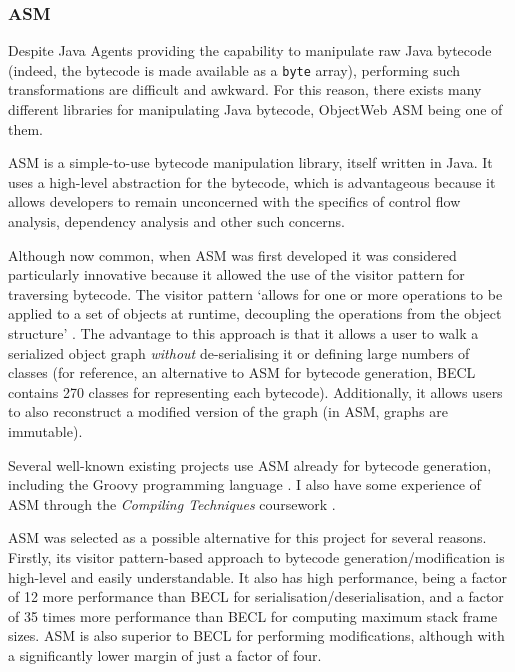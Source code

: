		\subsubsection{ASM} \label{sec:instrumentation/bytecode-instr/asm}
		Despite Java Agents providing the capability to manipulate raw Java bytecode (indeed, the bytecode is made available as a \texttt{byte} array), performing such transformations are difficult and awkward. For this reason, there exists many different libraries for manipulating Java bytecode, ObjectWeb ASM being one of them.
		
		ASM \citep{Bruneton2002} is a simple-to-use bytecode manipulation library, itself written in Java. It uses a high-level abstraction for the bytecode, which is advantageous because it allows developers to remain unconcerned with the specifics of control flow analysis, dependency analysis and other such concerns.
		
		Although now common, when ASM was first developed it was considered particularly innovative because it allowed the use of the visitor pattern \citep[p.~331]{Gamma1995} for traversing bytecode. The visitor pattern `allows for one or more operations to be applied to a set of objects at runtime, decoupling the operations from the object structure' \citep{McDonald2008}. The advantage to this approach is that it allows a user to walk a serialized object graph \emph{without} de-serialising it or defining large numbers of classes (for reference, an alternative to ASM for bytecode generation, BECL \citep{ApacheBECL} contains 270 classes for representing each bytecode). Additionally, it allows users to also reconstruct a modified version of the graph (in ASM, graphs are immutable).
		
		Several well-known existing projects use ASM already for bytecode generation, including the Groovy programming language \citep{GroovyDocs}. I also have some experience of ASM through the \textit{Compiling Techniques} coursework \citep{CTcoursework}.
		
		ASM was selected as a possible alternative for this project for several reasons. Firstly, its visitor pattern-based approach to bytecode generation/modification is high-level and easily understandable. It also has high performance, being a factor of 12 more performance than BECL for serialisation/deserialisation, and a factor of 35 times more performance than BECL for computing maximum stack frame sizes. ASM is also superior to BECL for performing modifications, although with a significantly lower margin of just a factor of four.
		

